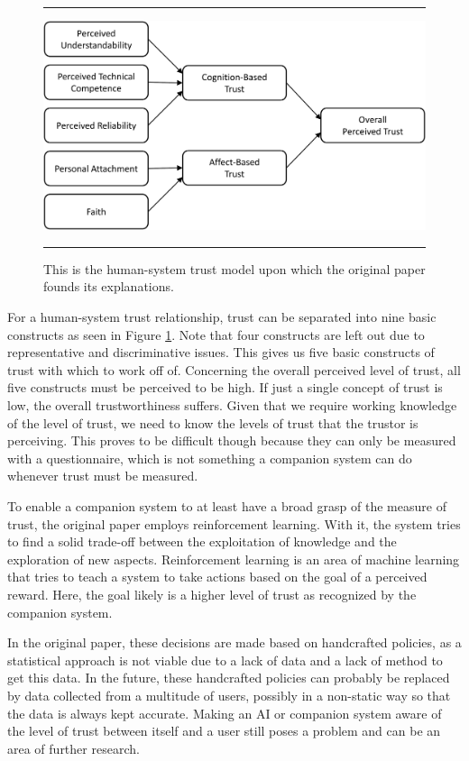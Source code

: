 \documentclass[a4paper]{article}
\begin{document}
\begin{figure}[H]
	\rule{\textwidth}{0.005in}
	\centering
	\includegraphics[width=12cm]{trust.png}
	\caption{This is the human-system trust model upon which the original paper founds its explanations.}
	\label{fig:hs_trust}
	\rule{\textwidth}{0.005in}
\end{figure}

For a human-system trust relationship, trust can be separated into nine basic constructs as seen in Figure \ref{fig:hs_trust}. Note that four constructs are left out due to representative and discriminative issues. This gives us five basic constructs of trust with which to work off of. Concerning the overall perceived level of trust, all five constructs must be perceived to be high. If just a single concept of trust is low, the overall trustworthiness suffers\cite{htc}. Given that we require working knowledge of the level of trust, we need to know the levels of trust that the trustor is perceiving. This proves to be difficult though because they can only be measured with a questionnaire, which is not something a companion system can do whenever trust must be measured.

To enable a companion system to at least have a broad grasp of the measure of trust, the original paper employs reinforcement learning. With it, the system tries to find a solid trade-off between the exploitation of knowledge and the exploration of new aspects. Reinforcement learning is an area of machine learning that tries to teach a system to take actions based on the goal of a perceived reward. Here, the goal likely is a higher level of trust as recognized by the companion system.

In the original paper, these decisions are made based on handcrafted policies, as a statistical approach is not viable due to a lack of data and a lack of method to get this data. In the future, these handcrafted policies can probably be replaced by data collected from a multitude of users, possibly in a non-static way so that the data is always kept accurate. Making an AI or companion system aware of the level of trust between itself and a user still poses a problem and can be an area of further research.
\end{document}
